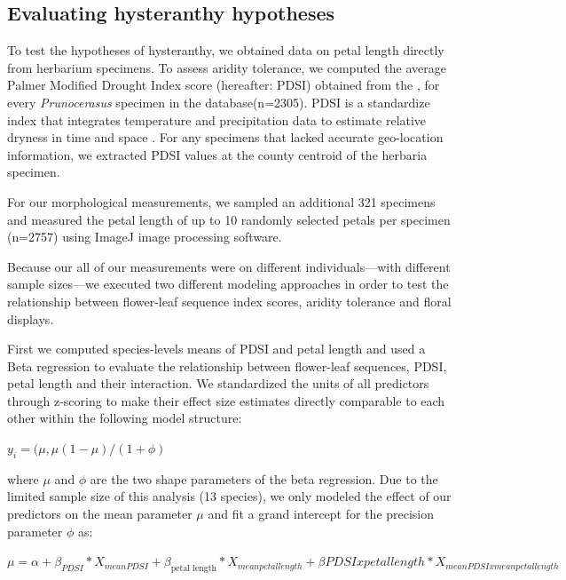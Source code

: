 \documentclass{article}[12pt]
\begin{document}
\subsection*{Evaluating hysteranthy hypotheses}

To test the hypotheses of hysteranthy, we obtained data on petal length directly from herbarium specimens. To assess aridity tolerance, we computed the average Palmer Modified Drought Index score (hereafter: PDSI) obtained from the \citet{NOAA}, for every \textit{Prunocerasus} specimen in the database(n=2305). PDSI is a standardize index that integrates temperature and precipitation data to estimate relative dryness in time and space \citep{Heim:2002uw}. For any specimens that lacked accurate geo-location information, we extracted PDSI values at the county centroid of the herbaria specimen. 

\noindent For our morphological measurements, we sampled an additional 321 specimens and measured the petal length of up to 10 randomly selected petals per specimen (n=2757) using ImageJ image processing software.%

Because our all of our measurements were on different individuals---with different sample sizes---we executed two different modeling approaches in order to test the relationship between flower-leaf sequence index scores, aridity tolerance and floral displays.

First we computed species-levels means of PDSI and petal length and used a Beta regression to evaluate the relationship between flower-leaf sequences, PDSI, petal length and their interaction. We standardized the units of all predictors through z-scoring \citep{Gelman2007} to make their effect size estimates directly comparable to each other within the following model structure:

$y_i = (\mu,\mu(1-\mu)/(1+\phi)$

where $\mu$ and $\phi$ are the two shape parameters of the beta regression. Due to the limited sample size of this analysis (13 species), we only modeled the effect of our predictors on the mean parameter $\mu$ and fit a grand intercept for the precision parameter $\phi$ as:

$\mu = \alpha+ \beta_{PDSI}*X_{mean PDSI}+\beta_{\text{petal length}}*X_{mean petal length}+\beta{PDSI x petal length}*X_{mean PDSI x mean petal length}$
\end{document}
